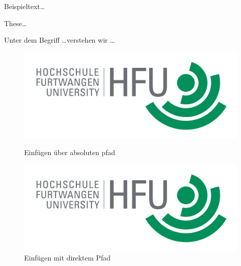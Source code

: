 \lipsum[2]

\begin{beispiel}
Beispieltext\dots
\end{beispiel}
 
\lipsum[2]

\begin{these}
These\dots
\end{these}
 
\lipsum[2]
 
\begin{definition}
Unter dem Begriff \dots verstehen wir \dots
\end{definition}

\lipsum[2]

\begin{figure}
\caption{Einfügen über absoluten pfad}
\includegraphics[width=1\textwidth]{content/pictures/hfu}
\label{pic:bild3}
\end{figure}

\begin{figure}
	\centering
		\includegraphics[width=13cm]{content/pictures/hfu.jpg}
	\caption{Einfügen mit direktem Pfad}
	\label{La12bel}
\end{figure}